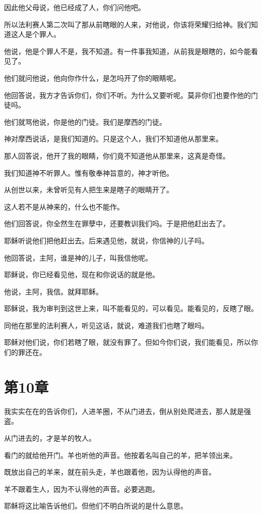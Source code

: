 \documentclass[12pt,oneside]{book}
\begin{document}
因此他父母说，他已经成了人，你们问他吧。

所以法利赛人第二次叫了那从前瞎眼的人来，对他说，你该将荣耀归给神。我们知道这人是个罪人。

他说，他是个罪人不是，我不知道。有一件事我知道，从前我是眼瞎的，如今能看见了。

他们就问他说，他向你作什么，是怎吗开了你的眼睛呢。

他回答说，我方才告诉你们，你们不听。为什么又要听呢。莫非你们也要作他的门徒吗。

他们就骂他说，你是他的门徒。我们是摩西的门徒。

神对摩西说话，是我们知道的。只是这个人，我们不知道他从那里来。

那人回答说，他开了我的眼睛，你们竟不知道他从那里来，这真是奇怪。

我们知道神不听罪人。惟有敬奉神旨意的，神才听他。

从创世以来，未曾听见有人把生来是瞎子的眼睛开了。

这人若不是从神来的，什么也不能作。

他们回答说，你全然生在罪孽中，还要教训我们吗。于是把他赶出去了。

耶稣听说他们把他赶出去。后来遇见他，就说，你信神的儿子吗。

他回答说，主阿，谁是神的儿子，叫我信他呢。

耶稣说，你已经看见他，现在和你说话的就是他。

他说，主阿，我信。就拜耶稣。

耶稣说，我为审判到这世上来，叫不能看见的，可以看见。能看见的，反瞎了眼。

同他在那里的法利赛人，听见这话，就说，难道我们也瞎了眼吗。

耶稣对他们说，你们若瞎了眼，就没有罪了。但如今你们说，我们能看见，所以你们的罪还在。

\chapter{第10章}
我实实在在的告诉你们，人进羊圈，不从门进去，倒从别处爬进去，那人就是强盗。

从门进去的，才是羊的牧人。

看门的就给他开门。羊也听他的声音。他按着名叫自己的羊，把羊领出来。

既放出自己的羊来，就在前头走，羊也跟着他，因为认得他的声音。

羊不跟着生人，因为不认得他的声音。必要逃跑。

耶稣将这比喻告诉他们。但他们不明白所说的是什么意思。
\end{document}
